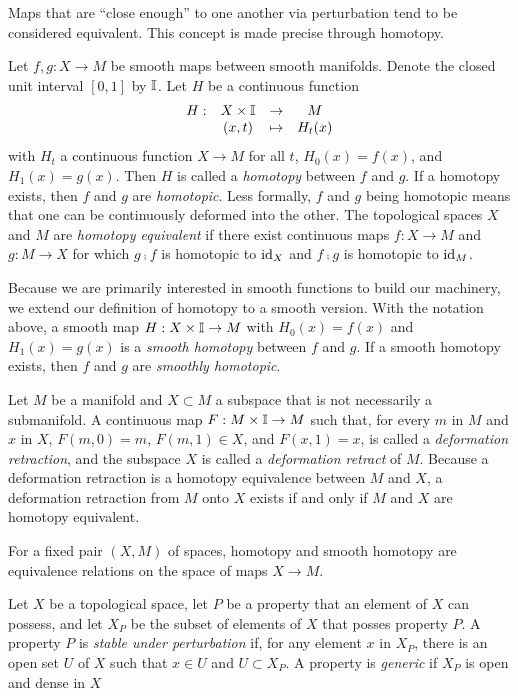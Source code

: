 Maps that are ``close enough'' to one another via perturbation tend to be considered equivalent.
This concept is made precise through homotopy.

\begin{defn}[Homotopy]
	\label{def:homotopy}
	Let $f,g:X\to M$ be smooth maps between smooth manifolds.
	Denote the closed unit interval $[0,1]$ by $\mathbb{I}$.
	Let $H$ be a continuous function 
	\[
		\begin{array}{cccc}
			H: & X\times \mathbb{I} & \to & M \\
			& (x,t)	& \mapsto & H_t(x)
		\end{array}
	\]
	with $H_t$ a continuous function $X\to M$ for all $t$, $H_0(x)=f(x)$, and $H_1(x)=g(x)$.
	Then $H$ is called a \emph{homotopy} between $f$ and $g$.
	If a homotopy exists, then $f$ and $g$ are \emph{homotopic}.
	Less formally, $f$ and $g$ being homotopic means that one can be continuously deformed into the other.
	The topological spaces $X$ and $M$ are \emph{homotopy equivalent} if there exist continuous maps $f:X\to M$ and $g:M\to X$ for which $g\comp f$ is homotopic to $\textrm{id}_{X}$ and $f\comp g$ is homotopic to $\textrm{id}_{M}$.
	
	Because we are primarily interested in smooth functions to build our machinery, we extend our definition of homotopy to a smooth version.
	With the notation above, a smooth map $H:X\times\mathbb{I}\to M$ with $H_0(x)=f(x)$ and $H_1(x)=g(x)$ is a \emph{smooth homotopy} between $f$ and $g$.
	If a smooth homotopy exists, then $f$ and $g$ are \emph{smoothly homotopic}.
	
	Let $M$ be a manifold and $X\subset M$ a subspace that is not necessarily a submanifold.
	A continuous map $F:M\times\mathbb{I}\to M$ such that, for every $m$ in $M$ and $x$ in $X$, $F(m,0)=m$, $F(m,1)\in X$, and $F(x,1)=x$, is called a \emph{deformation retraction}, and the subspace $X$ is called a \emph{deformation retract} of $M$.
	Because a deformation retraction is a homotopy equivalence between $M$ and $X$, a deformation retraction from $M$ onto $X$ exists if and only if $M$ and $X$ are homotopy equivalent.
\end{defn}

\begin{prop}
	For a fixed pair $(X,M)$ of spaces, homotopy and smooth homotopy are equivalence relations on the space of maps $X\to M$.
\end{prop}

\begin{defn}
	Let $X$ be a topological space, let $P$ be a property that an element of $X$ can possess, and let $X_P$ be the subset of elements of $X$ that posses property $P$.
	A property $P$ is \emph{stable under perturbation} if, for any element $x$ in $X_P$, there is an open set $U$ of $X$ such that $x\in U$ and $U\subset X_P$.
	A property is \emph{generic} if $X_P$ is open and dense in $X$
\end{defn}

